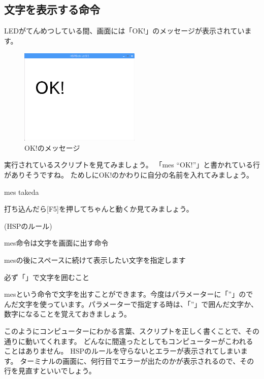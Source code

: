\clearpage

\subsection{文字を表示する命令}

LEDがてんめつしている間、画面には「OK!」のメッセージが表示されています。

\begin{figure}[H]
    \begin{center}
        \includegraphics[keepaspectratio,width=5.741cm,height=4.572cm]{text02-img/text02-img027.png}
        \caption{OK!のメッセージ}
    \end{center}
\end{figure}

実行されているスクリプトを見てみましょう。
「mes “OK!”」と書かれている行がありそうですね。
ためしに{\textquotedbl}OK!{\textquotedbl}のかわりに自分の名前を入れてみましょう。

\begin{description}
    \item mes {\textquotedbl}takeda{\textquotedbl}
\end{description}

打ち込んだら[F5]を押してちゃんと動くか見てみましょう。

\begin{description}
    \item (HSPのルール)
\end{description}

\begin{description}
    \item mes命令は文字を画面に出す命令
    \item mesの後にスペースに続けて表示したい文字を指定します
    \item 必ず「{\textquotedbl}」で文字を囲むこと
\end{description}

mesという命令で文字を出すことができます。今度はパラメーターに「”」のでんだ文字を使っています。パラメーターで指定する時は、「”」で囲んだ文字か、数字になることを覚えておきましょう。

このようにコンピューターにわかる言葉、スクリプトを正しく書くことで、その通りに動いてくれます。
どんなに間違ったとしてもコンピューターがこわれることはありません。
HSPのルールを守らないとエラーが表示されてしまいます。
ターミナルの画面に、何行目でエラーが出たのかが表示されるので、その行を見直すといいでしょう。